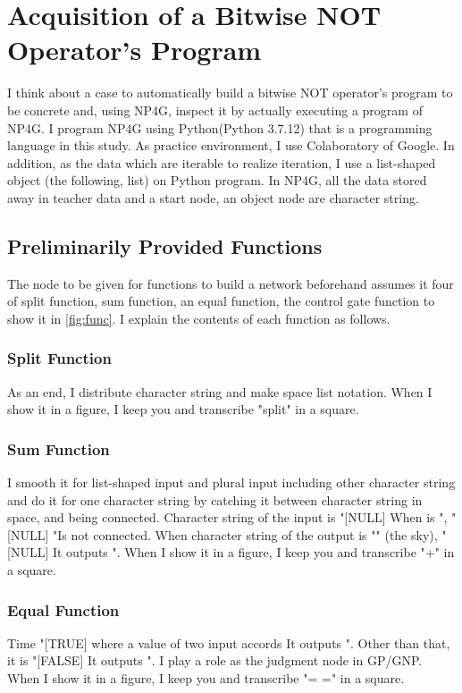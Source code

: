 \documentclass{article}
\begin{document}
\section {Acquisition of a Bitwise NOT Operator's Program}
I think about a case to automatically build a bitwise NOT operator's program to be concrete and, using NP4G, inspect it by actually executing a program of NP4G.
I program NP4G using Python(Python 3.7.12) that is a programming language in this study.
As practice environment, I use Colaboratory of Google.
In addition, as the data which are iterable to realize iteration, I use a list-shaped object (the following, list) on Python program.
In NP4G, all the data stored away in teacher data and a start node, an object node are character string.

\subsection {Preliminarily Provided Functions}
The node to be given for functions to build a network beforehand assumes it four of split function, sum function, an equal function, the control gate function to show it in \ref{fig:func}.
I explain the contents of each function as follows.

\subsubsection{Split Function}
As an end, I distribute character string and make space list notation.
When I show it in a figure, I keep you and transcribe "split" in a square.

\subsubsection{Sum Function}
I smooth it for list-shaped input and plural input including other character string and do it for one character string by catching it between character string in space, and being connected.
Character string of the input is "[NULL]
When is ", "[NULL]
"Is not connected.
When character string of the output is "" (the sky), "[NULL]
It outputs ".
When I show it in a figure, I keep you and transcribe "+" in a square.

\subsubsection {Equal Function}
Time "[TRUE] where a value of two input accords
It outputs ".
Other than that, it is "[FALSE]
It outputs ".
I play a role as the judgment node in GP/GNP.
When I show it in a figure, I keep you and transcribe "= =" in a square.
\end{document}
